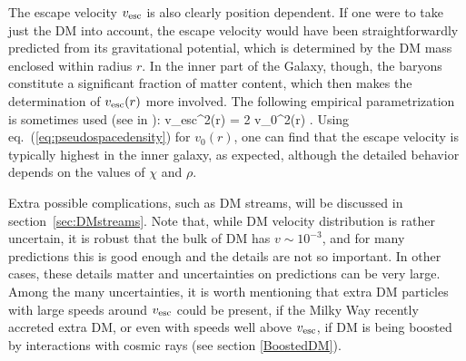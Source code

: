 The escape velocity $v_{\rm esc}$
is also clearly position dependent. If one were to take just the DM into account, the escape velocity would have been straightforwardly predicted from its gravitational potential, which is determined by the DM mass enclosed within radius $r$. In the inner part of the Galaxy, though, the baryons constitute a significant fraction of matter content, which then makes the determination of $v_{\rm esc}(r)$ more involved. The following empirical parametrization is sometimes used (see  in \cite{fvofr}):
\beq
\label{eq:vescofr}
v_{\rm esc}^2(r) = 2 v_0^2(r) .
\eeq
Using eq.~(\ref{eq:pseudospacedensity}) for $v_0(r)$, one can find that the escape velocity is typically highest in the inner galaxy, as expected, although the detailed behavior depends on the values of $\chi$ and $\rho$.

\smallskip

Extra possible complications, such as DM streams, will be discussed in section~\ref{sec:DMstreams}.
Note that, while DM velocity distribution is rather uncertain, it is robust that the bulk of DM has $v \sim 10^{-3}$, and for many predictions this is good enough and the details are not so important. In other cases, these details matter and uncertainties on predictions can be very large. 
Among the many uncertainties, it is worth mentioning that
extra DM particles with large speeds around $v_{\rm esc}$ could be 
present, if the Milky Way recently accreted extra DM, or even with speeds well above  $v_{\rm esc}$, if DM is being boosted by interactions with cosmic rays (see section \ref{BoostedDM}).




